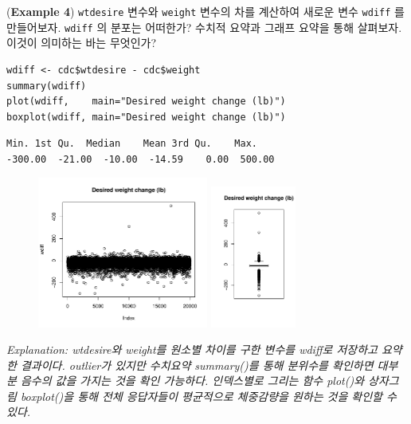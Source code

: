 \documentclass{article}
\begin{document}
(\textbf{Example 4}) \texttt{wtdesire} 변수와 \texttt{weight} 변수의 차를 계산하여 새로운 변수 \texttt{wdiff} 를 만들어보자. \texttt{wdiff} 의 분포는 어떠한가? 수치적 요약과 그래프 요약을 통해 살펴보자. 이것이 의미하는 바는 무엇인가?
\begin{lstlisting}[style={r-style}]
wdiff <- cdc$wtdesire - cdc$weight
summary(wdiff)
plot(wdiff,    main="Desired weight change (lb)")
boxplot(wdiff, main="Desired weight change (lb)")
\end{lstlisting}
\begin{lstlisting}[style={out-style}]
   Min. 1st Qu.  Median    Mean 3rd Qu.    Max. 
-300.00  -21.00  -10.00  -14.59    0.00  500.00 
\end{lstlisting}
\begin{figure}[htb!]
    \centering
    \includegraphics[width=0.5\textwidth]{fig/ex4.pdf}
    \includegraphics[width=0.25\textwidth]{fig/ex4-1.pdf}
    \label{fig:ex4}
\end{figure}
\emph{Explanation: wtdesire와 weight를 원소별 차이를 구한 변수를 wdiff로 저장하고 요약한 결과이다. outlier가 있지만 수치요약 summary()를 통해 분위수를 확인하면 대부분 음수의 값을 가지는 것을 확인 가능하다. 인덱스별로 그리는 함수 plot()와 상자그림 boxplot()을 통해 전체 응답자들이 평균적으로 체중감량을 원하는 것을 확인할 수 있다. }  \\
\end{document}
